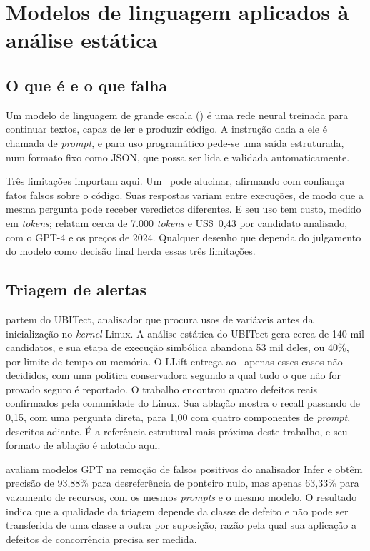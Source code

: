 \section{Modelos de linguagem aplicados à análise estática}
\label{sec:llm}

\subsection{O que é e o que falha}

Um modelo de linguagem de grande escala (\llm) é uma rede neural treinada para
continuar textos, capaz de ler e produzir código. A instrução dada a ele é
chamada de \textit{prompt}, e para uso programático pede-se uma saída
estruturada, num formato fixo como JSON, que possa ser lida e validada
automaticamente.

Três limitações importam aqui. Um \llm\ pode alucinar, afirmando com confiança
fatos falsos sobre o código. Suas respostas variam entre execuções, de modo que
a mesma pergunta pode receber veredictos diferentes. E seu uso tem custo,
medido em \textit{tokens};  relatam cerca de 7.000
\textit{tokens} e US\$~0,43 por candidato analisado, com o GPT-4 e os preços de
2024. Qualquer desenho que dependa do julgamento do modelo como decisão final
herda essas três limitações.

\subsection{Triagem de alertas}

 partem do UBITect, analisador que procura usos de variáveis
antes da inicialização no \textit{kernel} Linux. A análise estática do UBITect
gera cerca de 140 mil candidatos, e sua etapa de execução simbólica abandona 53
mil deles, ou 40\%, por limite de tempo ou memória. O LLift entrega ao \llm\
apenas esses casos não decididos, com uma política conservadora segundo a qual
tudo o que não for provado seguro é reportado. O trabalho encontrou quatro
defeitos reais confirmados pela comunidade do Linux. Sua ablação mostra o
recall passando de 0,15, com uma pergunta direta, para 1,00 com quatro
componentes de \textit{prompt}, descritos adiante. É a referência estrutural
mais próxima deste trabalho, e seu formato de ablação é adotado aqui.

 avaliam modelos GPT na remoção de falsos positivos
do analisador Infer e obtêm precisão de 93,88\% para desreferência de ponteiro
nulo, mas apenas 63,33\% para vazamento de recursos, com os mesmos
\textit{prompts} e o mesmo modelo. O resultado indica que a qualidade da
triagem depende da classe de defeito e não pode ser transferida de uma classe a
outra por suposição, razão pela qual sua aplicação a defeitos de concorrência
precisa ser medida.

